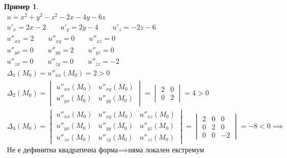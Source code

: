 \documentclass[a4paper,fleqn,12pt]{article}
\theoremstyle{definition}
\newtheorem{example}{Пример}[subsection]
\begin{document}
\begin{example}
\begin{gather*}
u = x^2 + y^2 - z^2 - 2x - 4y - 6z\\
u'_x = 2x - 2 \qquad u'_y = 2y - 4 \qquad u'_z = -2z - 6 \\
u''_{xx} = 2 \qquad u''_{xy} = 0 \qquad u''_{xz} = 0 \\
u''_{yx} = 0 \qquad u''_{yy} = 2 \qquad u''_{yz} = 0 \\
u''_{zx} = 0 \qquad u''_{zy} = 0 \qquad u''_{zz} = -2 \\
\Delta_1 (M_0) = u''_{xx}(M_0) = 2 > 0 \\
\Delta_2 (M_0) = 
\begin{vmatrix}
u''_{xx}(M_0) &  u''_{xy}(M_0) \\ 
u''_{yx}(M_0) &  u''_{yy}(M_0) 
\end{vmatrix} = 
\begin{vmatrix}
2 & 0 \\ 
0 & 2
\end{vmatrix} = 4 >0 \\
\Delta_3 (M_0) = 
\begin{vmatrix}
u''_{xx}(M_0) &  u''_{xy}(M_0)  & u''_{xz}(M_0)\\ 
u''_{yx}(M_0) &  u''_{yy}(M_0)  & u''_{yz}(M_0) \\
u''_{zx}(M_0) &  u''_{zy}(M_0)  & u''_{zz}(M_0)
\end{vmatrix} = 
\begin{vmatrix}
2 &  0  & 0\\ 
0 & 2  & 0 \\
0 & 0 & -2
\end{vmatrix} = -8 < 0 \implies \\
\text{Не е дефинитна квадратична форма} \implies \text{няма локален екстремум}
\end{gather*} 
\end{example}
\end{document}
